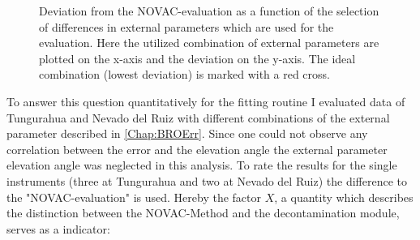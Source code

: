 \documentclass  [
  paper    = a4,
  BCOR     = 10mm,
  twoside,
  fontsize = 12pt,
  fleqn,
  toc      = bibnumbered,
  toc      = listofnumbered,
  numbers  = noendperiod,
  headings = normal,
  listof   = leveldown,
  version  = 3.03
]                                       {scrreprt}
\begin{document}
	\begin{figure}
		\caption[Deviation from the NOVAC-evaluation as a function of the selection of differences in external parameters which are used for the evaluation.]{Deviation from the NOVAC-evaluation as a function of the selection of differences in external parameters which are used for the evaluation. Here the utilized combination of external parameters are plotted on the x-axis and the deviation on the y-axis. The ideal combination (lowest deviation) is marked with a red cross.}
		\label{fig:WelcheEP}
	\end{figure}
	To answer this question quantitatively for the fitting routine I evaluated data of Tungurahua and Nevado del Ruiz with different combinations of the external parameter described in \cref{Chap:BROErr}. Since one could not observe any correlation between the  error and the elevation angle the external parameter elevation angle was neglected in this analysis. To rate the results for the single instruments (three at Tungurahua and two at Nevado del Ruiz) the difference to the "NOVAC-evaluation" is used. Hereby the factor $X$, a quantity which describes the distinction between the NOVAC-Method and the decontamination module, serves as a indicator:
\end{document}
